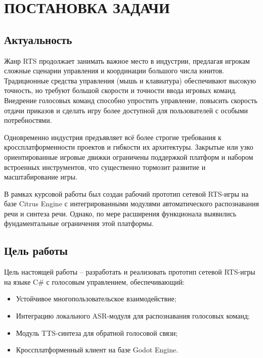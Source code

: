 \section{ПОСТАНОВКА ЗАДАЧИ}

    \subsection{Актуальность} 
    Жанр RTS продолжает занимать важное место в индустрии, предлагая игрокам сложные сценарии управления и координации большого числа юнитов. 
    Традиционные средства управления (мышь и клавиатура) обеспечивают высокую точность, но требуют большой скорости и точности ввода игровых команд. Внедрение голосовых команд способно упростить управление, повысить скорость отдачи приказов и сделать игру более 
    доступной для пользователей с особыми потребностями.

    Одновременно индустрия предъявляет всё более строгие требования к кроссплатформенности проектов и гибкости их архитектуры. Закрытые или узко 
    ориентированные игровые движки ограничены поддержкой платформ и набором встроенных инструментов, что существенно тормозит 
    развитие и масштабирование игры.

    В рамках курсовой работы был создан рабочий прототип сетевой RTS-игры на базе Citrus Engine с интегрированными модулями автоматического 
    распознавания речи и синтеза речи. Однако, по мере расширения функционала выявились фундаментальные ограничения этой платформы.

    \subsection{Цель работы}
    Цель настоящей работы -- разработать и реализовать прототип сетевой RTS-игры на языке C\# с голосовым управлением, обеспечивающий:
    \begin{itemize}
        \item Устойчивое многопользовательское взаимодействие;
        \item Интеграцию локального ASR-модуля для распознавания голосовых команд;
        \item Модуль TTS-синтеза для обратной голосовой связи;
        \item Кроссплатформенный клиент на базе Godot Engine.
    \end{itemize}



